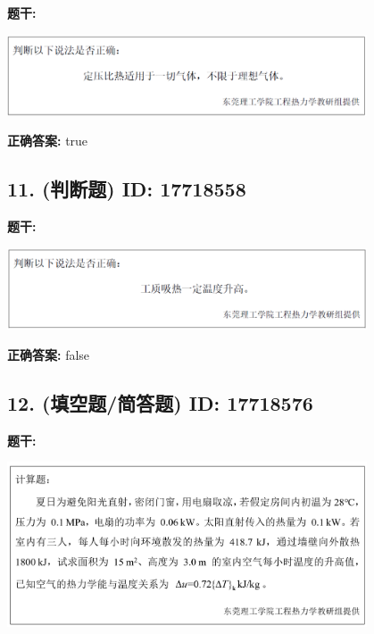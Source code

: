 \documentclass[12pt]{article}
\begin{document}
\textbf{题干:}


\begin{center}\includegraphics[width=0.8\textwidth, height=0.25\textheight, keepaspectratio]{question_10_17718568/title_img_1.png}\end{center}

\textbf{正确答案:}
true

\vspace{0.5em}\hrulefill\vspace{1em}

\subsection*{11. (判断题) \small ID: 17718558}

\textbf{题干:}


\begin{center}\includegraphics[width=0.8\textwidth, height=0.25\textheight, keepaspectratio]{question_11_17718558/title_img_1.png}\end{center}

\textbf{正确答案:}
false

\vspace{0.5em}\hrulefill\vspace{1em}

\subsection*{12. (填空题/简答题) \small ID: 17718576}

\textbf{题干:}


\begin{center}\includegraphics[width=0.8\textwidth, height=0.25\textheight, keepaspectratio]{question_12_17718576/title_img_1.png}\end{center}
\end{document}
